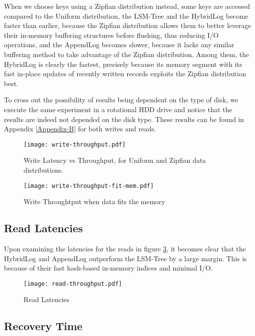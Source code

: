 When we choose keys using a Zipfian distribution instead, some keys are accessed compared to the Uniform distribution, the LSM-Tree and the HybridLog become faster than earlier, because the Zipfian distribution allows them to better leverage their in-memory buffering structures before flushing, thus reducing I/O operations, and the AppendLog becomes slower, because it lacks any similar buffering method to take advantage of the Zipfian distribution. Among them, the HybridLog is clearly the fastest, precisely because its memory segment with its fast in-place updates of recently written records exploits the Zipfian distribution best.

To cross out the possibility of results being dependent on the type of disk, we execute the same experiment in a rotational HDD drive and notice that the results are indeed not depended on the disk type. These results can be found in Appendix \ref{Appendix-B} for both writes and reads.

\begin{figure}[h]
    \centering
    \texttt{[image: write-throughput.pdf]}
    \caption{Write Latency vs Throughput, for Uniform and Zipfian data distributions.}
    \label{fig:comparison-write}
\end{figure}

\begin{figure}[h]
    \centering
    \texttt{[image: write-throughput-fit-mem.pdf]}
    \caption{Write Throughtput when data fits the memory}
    \label{fig:comparison-write-fit-mem}
\end{figure}

\subsection{Read Latencies}

Upon examining the latencies for the reads in figure \ref{fig:comparison-read-latencies}, it becomes clear that the HybridLog and AppendLog outperform the LSM-Tree by a large margin. This is because of their fast hash-based in-memory indices and minimal I/O.

\begin{figure}[h]
    \centering
    \texttt{[image: read-throughput.pdf]}
    \caption{Read Latencies}
    \label{fig:comparison-read-latencies}
\end{figure}

\subsection{Recovery Time}

